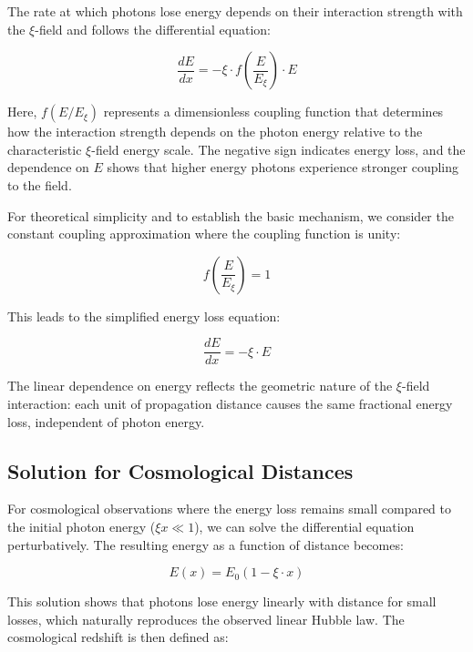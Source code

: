 \documentclass[12pt,a4paper]{report}
\begin{document}
	The rate at which photons lose energy depends on their interaction strength with the $\xi$-field and follows the differential equation:
	
	\begin{equation}
		\frac{dE}{dx} = -\xi \cdot f\left(\frac{E}{E_\xi}\right) \cdot E
	\end{equation}
	
	Here, $f(E/E_\xi)$ represents a dimensionless coupling function that determines how the interaction strength depends on the photon energy relative to the characteristic $\xi$-field energy scale. The negative sign indicates energy loss, and the dependence on $E$ shows that higher energy photons experience stronger coupling to the field.
	
	For theoretical simplicity and to establish the basic mechanism, we consider the constant coupling approximation where the coupling function is unity:
	
	\begin{equation}
		f\left(\frac{E}{E_\xi}\right) = 1
	\end{equation}
	
	This leads to the simplified energy loss equation:
	
	\begin{equation}
		\frac{dE}{dx} = -\xi \cdot E
	\end{equation}
	
	The linear dependence on energy reflects the geometric nature of the $\xi$-field interaction: each unit of propagation distance causes the same fractional energy loss, independent of photon energy.
	
	\subsection{Solution for Cosmological Distances}
	
	For cosmological observations where the energy loss remains small compared to the initial photon energy ($\xi x \ll 1$), we can solve the differential equation perturbatively. The resulting energy as a function of distance becomes:
	
	\begin{equation}
		E(x) = E_0 \left(1 - \xi \cdot x\right)
	\end{equation}
	
	This solution shows that photons lose energy linearly with distance for small losses, which naturally reproduces the observed linear Hubble law. The cosmological redshift is then defined as:
	
\end{document}
